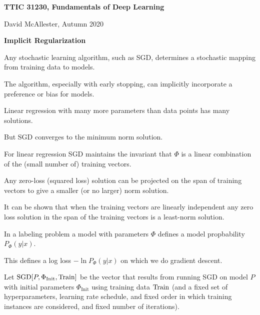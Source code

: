 





{\Huge


\centerline{\bf TTIC 31230, Fundamentals of Deep Learning}
\bigskip
\centerline{David McAllester, Autumn 2020}

\vfill
\centerline{\bf Implicit Regularization}
\vfill
\vfill


Any stochastic learning algorithm, such as SGD, determines a stochastic mapping from training data to models.

\vfill
The algorithm, especially with early stopping, can implicitly incorporate a preference or bias for models.


Linear regression with many more parameters than data points
has many solutions.

\vfill
But SGD converges to the minimum norm solution.


For linear regression SGD maintains the invariant that $\Phi$ is a linear combination of the (small number of) training vectors.

\vfill
Any zero-loss (squared loss) solution can be projected on the span of training vectors to give a smaller (or no larger) norm solution.

\vfill
It can be shown that when the training vectors are linearly independent any zero loss solution in the span of the training vectors is a least-norm solution.


In a labeling problem a model with parameters $\Phi$ defines a model propbability $P_\Phi(y|x)$.

\vfill
This defines a log loss $-\ln P_\Phi(y|x)$ on which we do gradient descent.

\vfill
Let {\color{red} $\mathrm{SGD}\!\left[P,\Phi_{\mathrm{Init}},\mathrm{Train}\right]$} be the vector that results from running SGD on model $P$ with initial parameters $\Phi_{\mathrm{Init}}$
using training data $\mathrm{Train}$ (and a fixed set of hyperparameters, learning rate schedule, and fixed order in which training instances are considered,
and fixed number of iterations).



}
